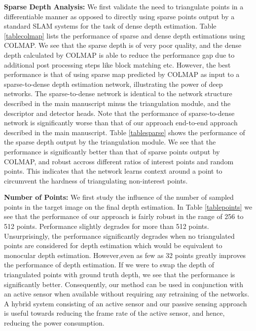 \documentclass[runningheads]{llncs}
\begin{document}
\vspace{4mm}
\noindent
\textbf{Sparse Depth Analysis:} We first validate the need to triangulate points in a differentiable manner as opposed to directly using sparse points output by a standard SLAM systems for the task of dense depth estimation. Table \ref{tablecolmap} lists the performance of sparse and dense depth estimations using COLMAP. We see that the sparse depth is of very poor quality, and the dense depth calculated by COLMAP is able to reduce the performance gap due to additional post processing steps like block matching etc. However, the best performance is that of using sparse map predicted by COLMAP as input to a sparse-to-dense depth estimation network, illustrating the power of deep networks. The sparse-to-dense network is identical to the network structure described in the main manuscript minus the triangulation module, and the descriptor and detector heads. Note that the performance of sparse-to-dense network is significantly worse than that of our approach end-to-end approach described in the main manuscript. Table \ref{tablesparse} shows the performance of the sparse depth output by the triangulation module. We see that the performance is significantly better than that of sparse points output by COLMAP, and robust accross different ratios of interest points and random points. This indicates that the network learns context around a point to circumvent the hardness of triangulating non-interest points. 



\vspace{4mm}
\noindent
\textbf{Number of Points:} We first study the influence of the number of sampled points in the target image on the final depth estimation. In Table \ref{tablepoints} we see that the performance of our approach is fairly robust in the range of 256 to 512 points. Performance slightly degrades for more than 512 points. Unsurprisingly, the performance significantly degrades when no triangulated points are considered for depth estimation which would be equivalent to monocular depth estimation. However,even as few as 32 points greatly improves the performance of depth estimation. If we were to swap the depth of triangulated points with ground truth depth, we see that the performance is significantly better. Consequently, our method can be used in conjunction with an active sensor when available without requiring any retraining of the networks. A hybrid system consisting of an active sensor and our passive sensing approach is useful towards reducing the frame rate of the active sensor, and hence, reducing the power consumption. 
\end{document}
